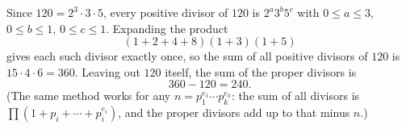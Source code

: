 Since $120=2^3\cdot3\cdot5$, every positive divisor of $120$ is $2^a3^b5^c$ with $0\le a\le3$, $0\le b\le1$, $0\le c\le1$. Expanding the product
\[(1+2+4+8)(1+3)(1+5)\]
gives each such divisor exactly once, so the sum of all positive divisors of $120$ is $15\cdot4\cdot6=360$. Leaving out $120$ itself, the sum of the proper divisors is
\[360-120=\boxed{240}.\]
(The same method works for any $n=p_1^{e_1}\cdots p_k^{e_k}$: the sum of all divisors is $\prod\left(1+p_i+\cdots+p_i^{e_i}\right)$, and the proper divisors add up to that minus $n$.)
